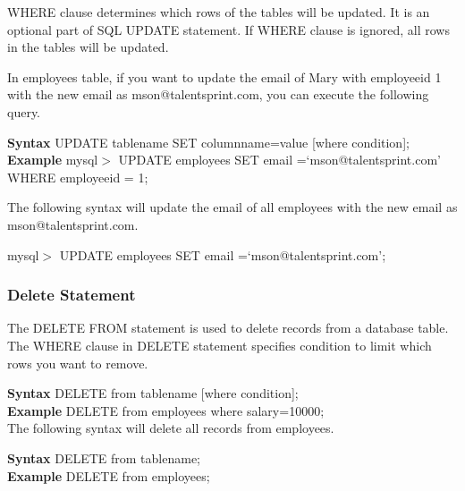 \documentclass[11pt,a4paper]{article}
\begin{document}
WHERE clause determines which rows of the tables will be updated. It is an optional part of SQL UPDATE statement. If WHERE clause is ignored, all rows in the tables will be
updated.

In employees table, if you want to update the email of Mary with employeeid 1 with the new email as mson@talentsprint.com, you can execute the following query.

\textbf{Syntax}
         UPDATE tablename SET columnname=value [where condition];
\textbf{Example}
mysql$>$ UPDATE employees SET email =`mson@talentsprint.com' 
                                      WHERE employeeid = 1;

The following syntax will update the email of all employees with the new email as mson@talentsprint.com.

mysql$>$ UPDATE employees SET email =`mson@talentsprint.com';

\subsubsection*{Delete Statement}

The DELETE FROM statement is used to delete records from a database table. The WHERE clause in DELETE statement specifies condition to limit which rows you want to
remove.

\textbf{Syntax}
         DELETE from tablename [where condition];\\
\textbf{Example}
         DELETE from employees where salary=10000;\\
        
The following syntax will delete all records from employees.

\textbf{Syntax}
         DELETE from tablename;\\
\textbf{Example}
         DELETE from employees;\\
\end{document}

